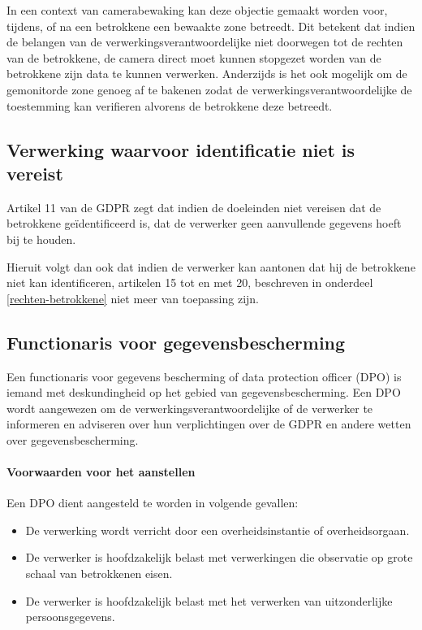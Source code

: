 In een context van camerabewaking kan deze objectie gemaakt worden voor, tijdens, of na een betrokkene een bewaakte zone betreedt. Dit betekent dat indien de belangen van de verwerkingsverantwoordelijke niet doorwegen tot de rechten van de betrokkene, de camera direct moet kunnen stopgezet worden van de betrokkene zijn data te kunnen verwerken. Anderzijds is het ook mogelijk om de gemonitorde zone genoeg af te bakenen zodat de verwerkingsverantwoordelijke de toestemming kan verifieren alvorens de betrokkene deze betreedt. \autocite{edpb2019guidelines}


\subsection{Verwerking waarvoor identificatie niet is vereist}
Artikel 11 van de GDPR zegt dat indien de doeleinden niet vereisen dat de betrokkene geïdentificeerd is, dat de verwerker geen aanvullende gegevens hoeft bij te houden.
\par
Hieruit volgt dan ook dat indien de verwerker kan aantonen dat hij de betrokkene niet kan identificeren, artikelen 15 tot en met 20, beschreven in onderdeel \ref{rechten-betrokkene} niet meer van toepassing zijn.

\subsection{Functionaris voor gegevensbescherming}
Een functionaris voor gegevens bescherming of data protection officer (DPO) is iemand met deskundingheid op het gebied van gegevensbescherming. Een DPO wordt aangewezen om de verwerkingsverantwoordelijke of de verwerker te informeren en adviseren over hun verplichtingen over de GDPR en andere wetten over gegevensbescherming.

\paragraph{Voorwaarden voor het aanstellen}
Een DPO dient aangesteld te worden in volgende gevallen:
\begin{itemize}
	\item De verwerking wordt verricht door een overheidsinstantie of overheidsorgaan.
	\item De verwerker is hoofdzakelijk belast met verwerkingen die observatie op grote schaal van betrokkenen eisen.
	\item De verwerker is hoofdzakelijk belast met het verwerken van uitzonderlijke persoonsgegevens.
\end{itemize}

